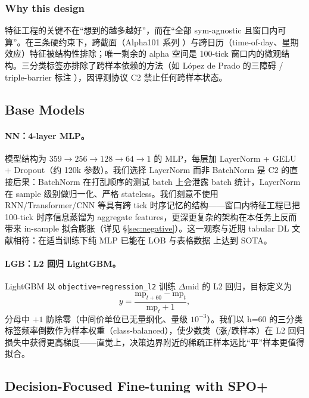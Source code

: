 \documentclass[11pt]{article}
\begin{document}
\subsubsection*{Why this design}
特征工程的关键不在``想到的越多越好''，而在``全部 sym-agnostic 且窗口内可算''。在三条硬约束下，跨截面（Alpha101 系列 \cite{alpha101}）与跨日历（time-of-day、星期效应）特征被结构性排除；唯一剩余的 alpha 空间是 100-tick 窗口内的微观结构。三分类标签亦排除了跨样本依赖的方法（如 López de Prado 的三障碍 / triple-barrier 标注 \cite{triple_barrier}），因评测协议 C2 禁止任何跨样本状态。

\subsection{Base Models}
\label{sec:base}

\paragraph{NN：4-layer MLP。}
模型结构为 $359 \to 256 \to 128 \to 64 \to 1$ 的 MLP，每层加 LayerNorm + GELU + Dropout（约 120k 参数）。我们选择 LayerNorm 而非 BatchNorm 是 C2 的直接后果：BatchNorm 在打乱顺序的测试 batch 上会泄露 batch 统计，LayerNorm 在 sample 级别做归一化、严格 stateless。我们刻意不使用 RNN/Transformer/CNN 等具有跨 tick 时序记忆的结构——窗口内特征工程已把 100-tick 时序信息蒸馏为 aggregate features，更深更复杂的架构在本任务上反而带来 in-sample 拟合膨胀（详见 \S\ref{sec:negative}）。这一观察与近期 tabular DL 文献相符：在适当训练下纯 MLP 已能在 LOB \cite{tlob_mlplob} 与表格数据 \cite{tabular_dl_simple} 上达到 SOTA。

\paragraph{LGB：L2 回归 LightGBM。}
LightGBM \cite{lightgbm} 以 \texttt{objective=regression\_l2} 训练 $\Delta$mid 的 L2 回归，目标定义为
\begin{equation}
\label{eq:label}
y = \frac{\mathrm{mp}_{t+60} - \mathrm{mp}_t}{\mathrm{mp}_t + 1},
\end{equation}
分母中 $+1$ 防除零（中间价单位已无量纲化、量级 $10^{-3}$）。我们以 h=60 的三分类标签频率倒数作为样本权重（class-balanced），使少数类（涨/跌样本）在 L2 回归损失中获得更高梯度——直觉上，决策边界附近的稀疏正样本远比``平''样本更值得拟合。

\subsection{Decision-Focused Fine-tuning with SPO+}
\label{sec:dfl}
\end{document}

